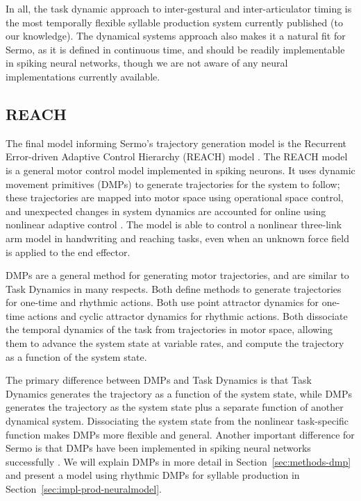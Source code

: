 In all, the task dynamic approach
to inter-gestural and inter-articulator timing
is the most temporally flexible
syllable production system
currently published
(to our knowledge).
The dynamical systems approach
also makes it a natural fit for Sermo,
as it is defined in continuous time,
and should be readily implementable
in spiking neural networks,
though we are not aware of any
neural implementations currently available.

\subsection{REACH}

The final model informing
Sermo's trajectory generation model is the
Recurrent Error-driven Adaptive Control Hierarchy (REACH)
model \citep{dewolf2015}.
The REACH model is a general motor control
model implemented in spiking neurons.
It uses dynamic movement primitives (DMPs)
to generate trajectories
for the system to follow;
these trajectories are mapped into
motor space using operational space control,
and unexpected changes in system dynamics
are accounted for online
using nonlinear adaptive control
\citep{slotine1987}.
The model is able to control
a nonlinear three-link arm model
in handwriting and reaching tasks,
even when an unknown force field
is applied to the end effector.

DMPs are a general method for generating motor trajectories,
and are similar to Task Dynamics in many respects.
Both define methods to generate trajectories
for one-time and rhythmic actions.
Both use point attractor dynamics
for one-time actions
and cyclic attractor dynamics
for rhythmic actions.
Both dissociate the temporal dynamics
of the task from trajectories
in motor space,
allowing them to advance the system state
at variable rates,
and compute the trajectory
as a function of the system state.

The primary difference between DMPs and Task Dynamics
is that Task Dynamics generates
the trajectory as a function
of the system state,
while DMPs generates the trajectory
as the system state
plus a separate function
of another dynamical system.
Dissociating the system state
from the nonlinear task-specific function
makes DMPs more flexible and general.
Another important difference for Sermo
is that DMPs have been implemented
in spiking neural networks successfully
\citep{dewolf2015}.
We will explain DMPs in more detail
in Section~\ref{sec:methods-dmp} and present a model
using rhythmic DMPs for syllable production
in Section~\ref{sec:impl-prod-neuralmodel}.

